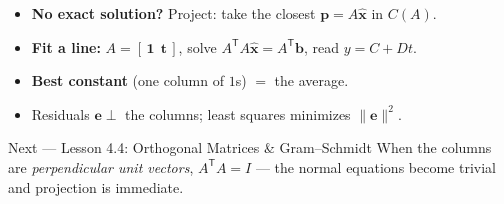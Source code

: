 \documentclass[aspectratio=169, 11pt]{beamer}
\newcommand{\xx}{\mathbf{x}}
\newcommand{\bb}{\mathbf{b}}
\newcommand{\pp}{\mathbf{p}}
\newcommand{\ee}{\mathbf{e}}
\newcommand{\T}{\mathsf{T}}
\begin{document}
\begin{frame}[t, plain]
  \begin{itemize}
    \setlength{\itemsep}{6pt}
    \item \textbf{No exact solution?} Project: take the closest $\pp=A\hat{\xx}$ in $C(A)$.
    \item \textbf{Fit a line:} $A=[\,\mathbf{1}\ \ \mathbf{t}\,]$, solve $A^{\T}A\hat{\xx}=A^{\T}\bb$, read $y=C+Dt$.
    \item \textbf{Best constant} (one column of $1$s) $=$ the average.
    \item Residuals $\ee\perp$ the columns; least squares minimizes $\|\ee\|^2$.
  \end{itemize}
  \vspace{2pt}
  \begin{block}{Next --- Lesson 4.4: Orthogonal Matrices \& Gram--Schmidt}
    When the columns are \emph{perpendicular unit vectors}, $A^{\T}A=I$ --- the normal equations become
    trivial and projection is immediate.
  \end{block}
\end{frame}
\end{document}
